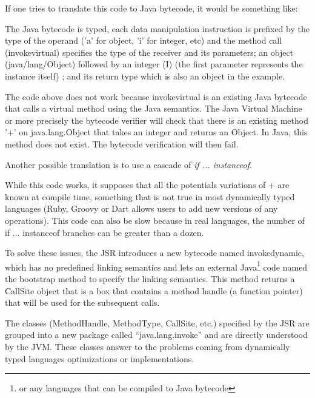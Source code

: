 \documentclass{sig-alternate}
\def \Jsr{JSR\xspace}
\def \JVM{JVM\xspace}
\begin{document}
      If one tries to translate this code to Java bytecode, it would be something like:

      

      The Java bytecode is typed, each data manipulation instruction is prefixed 
      by the type of the operand ('a' for object, 'i' for integer, etc)
      and the method call (invokevirtual) specifies the type of the receiver and its parameters;
      an object (java/lang/Object) followed by an integer (I) (the first parameter represents the instance itself) ; and its return type
      which is also an object in the example.

      The code above does not work because invokevirtual is an existing Java bytecode that calls a virtual method using the Java semantics.
      The Java Virtual Machine or more precisely the bytecode verifier will check that
      there is an existing method '+' on java.lang.Object that takes an integer and returns an Object.
      In Java, this method does not exist. The bytecode verification will then fail.

      Another possible translation is to use a cascade of \emph{if ... instanceof}.

      

      While this code works, it supposes that all the potentials variations of + are known at compile time,
      something that is not true in most dynamically typed languages (Ruby, Groovy or Dart allows users to add
      new versions of any operations).
      This code can also be slow because in real languages, the number of if ... instanceof branches
      can be greater than a dozen. 

      To solve these issues, the \Jsr introduces a new bytecode named invokedynamic, which has no predefined
      linking semantics and lets an external Java\footnote{or any languages that can be compiled to Java bytecode} code
      named the bootstrap method to specify the linking semantics.
      This method returns a CallSite object that is a box that contains a method handle (a function pointer)
      that will be used for the subsequent calls.

      The classes (MethodHandle, MethodType, CallSite, etc.) specified by the \Jsr are grouped into a new
      package called ``java.lang.invoke'' and are directly understood by the \JVM.
      These classes answer to the problems coming from dynamically typed languages optimizations or implementations.
\end{document}
